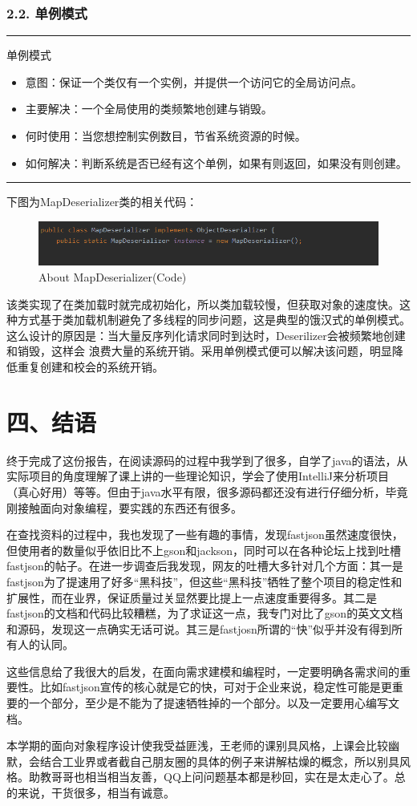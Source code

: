 \documentclass{article}
\begin{document}
\subsubsection*{2.2. 单例模式}
\noindent \rule{\textwidth}{0.7mm}
单例模式
\begin{itemize}
\item 意图：保证一个类仅有一个实例，并提供一个访问它的全局访问点。
\item 主要解决：一个全局使用的类频繁地创建与销毁。
\item 何时使用：当您想控制实例数目，节省系统资源的时候。
\item 如何解决：判断系统是否已经有这个单例，如果有则返回，如果没有则创建。
\end{itemize}
\rule{\textwidth}{0.7mm}
下图为MapDeserializer类的相关代码：
\begin{figure}[H]
\centering %
\includegraphics[width = 15cm]{pic18.png}
\caption{About MapDeserializer(Code)}
\end{figure}
该类实现了在类加载时就完成初始化，所以类加载较慢，但获取对象的速度快。这种方式基于类加载机制避免了多线程的同步问题，这是典型的饿汉式的单例模式。这么设计的原因是：当大量反序列化请求同时到达时，Deserilizer会被频繁地创建和销毁，这样会 浪费大量的系统开销。采用单例模式便可以解决该问题，明显降低重复创建和校会的系统开销。

\section*{\Large 四、结语}
终于完成了这份报告，在阅读源码的过程中我学到了很多，自学了java的语法，从实际项目的角度理解了课上讲的一些理论知识，学会了使用IntelliJ来分析项目（真心好用）等等。但由于java水平有限，很多源码都还没有进行仔细分析，毕竟刚接触面向对象编程，要实践的东西还有很多。


在查找资料的过程中，我也发现了一些有趣的事情，发现fastjson虽然速度很快，但使用者的数量似乎依旧比不上gson和jackson，同时可以在各种论坛上找到吐槽fastjson的帖子。在进一步调查后我发现，网友的吐槽大多针对几个方面：其一是fastjson为了提速用了好多“黑科技”，但这些“黑科技”牺牲了整个项目的稳定性和扩展性，而在业界，保证质量过关显然要比提上一点速度重要得多。其二是fastjson的文档和代码比较糟糕，为了求证这一点，我专门对比了gson的英文文档和源码，发现这一点确实无话可说。其三是fastjosn所谓的“快”似乎并没有得到所有人的认同。


这些信息给了我很大的启发，在面向需求建模和编程时，一定要明确各需求间的重要性。比如fastjson宣传的核心就是它的快，可对于企业来说，稳定性可能是更重要的一个部分，至少是不能为了提速牺牲掉的一个部分。以及一定要用心编写文档。


本学期的面向对象程序设计使我受益匪浅，王老师的课别具风格，上课会比较幽默，会结合工业界或者截自己朋友圈的具体的例子来讲解枯燥的概念，所以别具风格。助教哥哥也相当相当友善，QQ上问问题基本都是秒回，实在是太走心了。总的来说，干货很多，相当有诚意。
\end{document}
